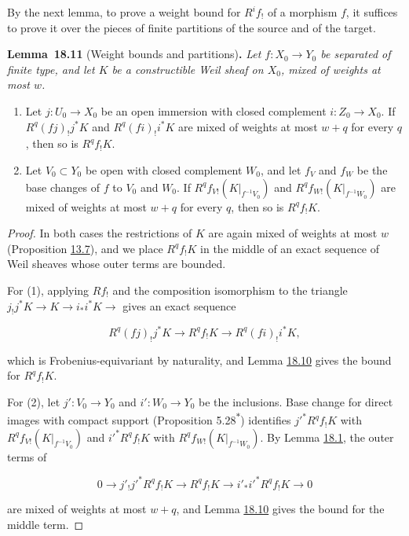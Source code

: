 \documentclass[11pt]{article}
\newenvironment{bpstatement}[2]{\par\addvspace{0.6\baselineskip}\noindent\textbf{#1}#2\textbf{.}\enspace\ignorespaces}
  {\par\addvspace{0.4\baselineskip}}
\newenvironment{bpstatementit}[2]{\begin{bpstatement}{#1}{#2}\itshape\ignorespaces}{\end{bpstatement}}
\newcommand{\bpout}[1]{#1\textsuperscript{\hyperlink{bp-outside}{\ensuremath{\ast}}}}
\begin{document}
\label{bp305}%
By the next lemma, to prove a weight bound for \(R^if_!\) of a morphism \(f\), it suffices to prove it over the pieces of finite partitions of the source and of the target.

\label{bp306}%
\begin{bpstatementit}{Lemma~18.11}{ (Weight bounds and partitions)}
Let \(f:X_0\to Y_0\) be separated of finite type, and let \(K\) be a constructible Weil sheaf on \(X_0\), mixed of weights at most \(w\).

\begin{enumerate}
\item Let \(j:U_0\to X_0\) be an open immersion with closed complement \(i:Z_0\to X_0\). If \(R^q(fj)_!j^*K\) and \(R^q(fi)_!i^*K\) are mixed of weights at most \(w+q\) for every \(q\), then so is \(R^qf_!K\).
\item Let \(V_0\subset Y_0\) be open with closed complement \(W_0\), and let \(f_V\) and \(f_W\) be the base changes of \(f\) to \(V_0\) and \(W_0\). If \(R^qf_{V!}(K|_{f^{-1}V_0})\) and \(R^qf_{W!}(K|_{f^{-1}W_0})\) are mixed of weights at most \(w+q\) for every \(q\), then so is \(R^qf_!K\).
\end{enumerate}
\end{bpstatementit}

\begin{proof}[{Proof}]\label{bp307}%
In both cases the restrictions of \(K\) are again mixed of weights at most \(w\) (Proposition \hyperref[bp24]{13.7}), and we place \(R^qf_!K\) in the middle of an exact sequence of Weil sheaves whose outer terms are bounded.

For (1), applying \(Rf_!\) and the composition isomorphism to the triangle \(j_!j^*K\to K\to i_*i^*K\to\) gives an exact sequence

\[
R^q(fj)_!j^*K\longrightarrow R^qf_!K\longrightarrow R^q(fi)_!i^*K,
\]

which is Frobenius-equivariant by naturality, and Lemma \hyperref[bp303]{18.10} gives the bound for \(R^qf_!K\).

For (2), let \(j':V_0\to Y_0\) and \(i':W_0\to Y_0\) be the inclusions. Base change for direct images with compact support (Proposition \bpout{5.28}) identifies \(j'^*R^qf_!K\) with \(R^qf_{V!}(K|_{f^{-1}V_0})\) and \(i'^*R^qf_!K\) with \(R^qf_{W!}(K|_{f^{-1}W_0})\). By Lemma \hyperref[bp275]{18.1}, the outer terms of

\[
0\longrightarrow j'_!j'^*R^qf_!K\longrightarrow R^qf_!K
\longrightarrow i'_*i'^*R^qf_!K\longrightarrow0
\]

are mixed of weights at most \(w+q\), and Lemma \hyperref[bp303]{18.10} gives the bound for the middle term.
\end{proof}
\end{document}
